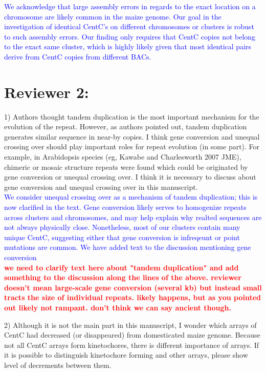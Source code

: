 \documentclass[]{article}
\newcommand{\res}[1]{\noindent \textcolor{blue}{{#1}} \\}
\newcommand{\jri}[1]{\textcolor{red}{{\bf #1}} }
\begin{document}
\res{We acknowledge that large assembly errors in regards to the exact location on a chromosome are likely common in the maize genome.  
Our goal in the investigation of identical CentC’s on different chromosomes or clusters is robust to such assembly errors.  
Our finding only requires that CentC copies not belong to the exact same cluster, which is highly likely given that most identical pairs derive from CentC copies from different BACs.  
}

\section*{Reviewer 2:}

1) Authors thought tandem duplication is the most important mechanism for the evolution of the repeat. However, as authors pointed out, tandem duplication generates similar sequence in near-by copies. I think gene conversion and unequal crossing over should play important roles for repeat evolution (in some part). For example, in Arabidopsis species (eg, Kawabe and Charlesworth 2007 JME), chimeric or mosaic structure repeats were found which could be originated by gene conversion or unequal crossing over. I think it is necessary to discuss about gene conversion and unequal crossing over in this manuscript.\\

\res{We consider unequal crossing over as a mechanism of tandem duplication; this is now clarified in the text. Gene conversion likely serves to homogenize repeats across clusters and chromosomes, and may help explain why realted sequences are not always physically close.  Nonetheless, most of our clusters contain many unique CentC, suggesting either that gene conversion is infreqeunt or point mutations are common. We have added text to the discussion mentioning gene conversion} \jri{we need to clarify text here about "tandem duplication" and add something to the discussion along the lines of the above.  reviewer doesn't mean large-scale gene conversion (several kb) but instead small tracts the size of individual repeats.  likely happens, but as you pointed out likely not rampant.  don't think we can say ancient though.\\} 

2) Although it is not the main part in this manuscript, I wonder which arrays of CentC had decreased (or disappeared) from domesticated maize genome. Because not all CentC arrays form kinetochores, there is different importance of arrays. If it is possible to distinguish kinetochore forming and other arrays, please show level of decrements between them.\\
\end{document}
